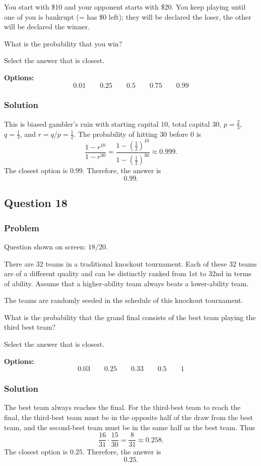 \documentclass[12pt]{article}
\begin{document}
You start with \$10 and your opponent starts with \$20. You keep playing until one of you is bankrupt (= has \$0 left); they will be declared the loser, the other will be declared the winner.

What is the probability that you win?

Select the answer that is closest.

\noindent\textbf{Options:}
\[
\boxed{0.01}
\qquad
\boxed{0.25}
\qquad
\boxed{0.5}
\qquad
\boxed{0.75}
\qquad
\boxed{0.99}
\]

\subsubsection{Solution}
This is biased gambler's ruin with starting capital \(10\), total capital \(30\), \(p=\frac{2}{3}\), \(q=\frac{1}{3}\), and \(r=q/p=\frac{1}{2}\). The probability of hitting \(30\) before \(0\) is
\[
\frac{1-r^{10}}{1-r^{30}}
=
\frac{1-\left(\frac{1}{2}\right)^{10}}{1-\left(\frac{1}{2}\right)^{30}}
\approx 0.999.
\]
The closest option is \(0.99\). Therefore, the answer is
\[
\boxed{0.99}.
\]

\subsection{Question 18}
\subsubsection{Problem}
Question shown on screen: \(18/20\).

There are 32 teams in a traditional knockout tournament. Each of these 32 teams are of a different quality and can be distinctly ranked from 1st to 32nd in terms of ability. Assume that a higher-ability team always beats a lower-ability team.

The teams are randomly seeded in the schedule of this knockout tournament.

What is the probability that the grand final consists of the best team playing the third best team?

Select the answer that is closest.

\noindent\textbf{Options:}
\[
\boxed{0.03}
\qquad
\boxed{0.25}
\qquad
\boxed{0.33}
\qquad
\boxed{0.5}
\qquad
\boxed{1}
\]

\subsubsection{Solution}
The best team always reaches the final. For the third-best team to reach the final, the third-best team must be in the opposite half of the draw from the best team, and the second-best team must be in the same half as the best team. Thus
\[
\frac{16}{31}\cdot \frac{15}{30}
=
\frac{8}{31}
\approx 0.258.
\]
The closest option is \(0.25\). Therefore, the answer is
\[
\boxed{0.25}.
\]
\end{document}
